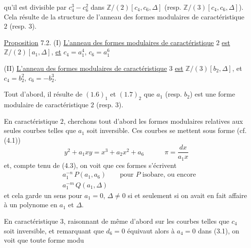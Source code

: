 
qu'il est divisible par $c_4^3-c_6^2$ dans $\mathbb{Z}/(2)[c_4,c_6,\Delta]$ (resp. $\mathbb{Z}/(3)[c_4,c_6,\Delta]$). Cela résulte de la structure de l'anneau des formes modulaires de caractéristique $2$ (resp. $3$).

\uline{Proposition} 7.2. (I) \uline{L'anneau des formes modulaires de caractéristique} $2$ \uline{est} $\mathbb{Z}/(2)[a_1,\Delta]$, \uline{et} $c_4=a_1^4$, $c_6=a_1^6$

(II) \uline{L'anneau des formes modulaires de caractéristique} $3$ \uline{est} $\mathbb{Z}/(3)[b_2,\Delta]$, et $c_4=b_2^2$, $c_6=-b_2^3$.

Tout d'abord, il résulte de $(1.6)_1$ et $(1.7)_2$ que $a_1$ (resp. $b_2$) est une forme modulaire de caractéristique $2$ (resp. $3$).

En caractéristique $2$, cherchons tout d'abord les formes modulaires relatives aux seules courbes telles que $a_1$ soit inversible. Ces courbes se mettent sous forme (cf. (4.1))
\[
y^2+a_1xy=x^3+a_2x^2+a_6\qquad\quad\pi=\frac{dx}{a_1x}
\]
et, compte tenu de (4.3), on voit que ces formes s'écrivent
\[
\begin{aligned}
&a_1^{-n}\,P(a_1,a_6)\qquad\text{pour }P\text{ isobare, ou encore}\\
&a_1^{-m}\,Q(a_1,\Delta)
\end{aligned}
\]
et cela garde un sens pour $a_1=0$, $\Delta\ne0$ si et seulement si on avait en fait affaire à un polynome en $a_1$ et $\Delta$.

En caractéristique $3$, raisonnant de même d'abord sur les courbes telles que $c_4$ soit inversible, et remarquant que $d_6=0$ équivaut alors à $a_4=0$ dans (3.1), on voit que toute forme modu%
